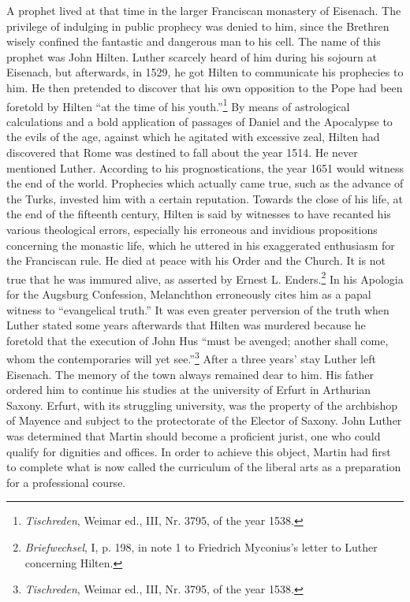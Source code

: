 A prophet lived at that time in the larger Franciscan monastery of
Eisenach. The privilege of indulging in public prophecy was denied
to him, since the Brethren wisely confined the fantastic and dangerous
man to his cell. The name of this prophet was John Hilten. Luther
scarcely heard of him during his sojourn at Eisenach, but afterwards,
in 1529, he got Hilten to communicate his prophecies to him. He
then pretended to discover that his own opposition to the Pope had
been foretold by Hilten “at the time of his youth.”\footnote{\textit{Tischreden}, Weimar ed., III, Nr. 3795, of the year 1538.}
By means of
astrological calculations and a bold application of passages of Daniel
and the Apocalypse to the evils of the age, against which he agitated
with excessive zeal, Hilten had discovered that Rome was destined to
fall about the year 1514. He never mentioned Luther. According to
his prognostications, the year 1651 would witness the end of the
world. Prophecies which actually came true, such as the advance of
the Turks, invested him with a certain reputation. Towards the close
of his life, at the end of the fifteenth century, Hilten is said by witnesses to have recanted his various theological errors, especially his
erroneous and invidious propositions concerning the monastic life,
which he uttered in his exaggerated enthusiasm for the Franciscan
rule. He died at peace with his Order and the Church. It is not true
that he was immured alive, as asserted by Ernest L. Enders.\footnote{\textit{Briefwechsel}, I, p. 198, in note 1 to Friedrich Myconius’s letter to Luther concerning Hilten.}
In his
Apologia for the Augsburg Confession, Melanchthon erroneously
cites him as a papal witness to “evangelical truth.” It was even greater
perversion of the truth when Luther stated some years afterwards
that Hilten was murdered because he foretold that the execution of
John Hus “must be avenged; another shall come, whom the contemporaries will yet see.”\footnote{\textit{Tischreden}, Weimar ed., III, Nr. 3795, of the year 1538.}
After a three years’ stay Luther left Eisenach. The memory of the
town always remained dear to him. His father ordered him to continue his studies at the university of Erfurt in Arthurian Saxony.
Erfurt, with its struggling university, was the property of the archbishop
of Mayence and subject to the protectorate of the Elector of
Saxony. John Luther was determined that Martin should become a
proficient jurist, one who could qualify for dignities and offices. In
order to achieve this object, Martin had first to complete what is now
called the curriculum of the liberal arts as a preparation for a professional course.

